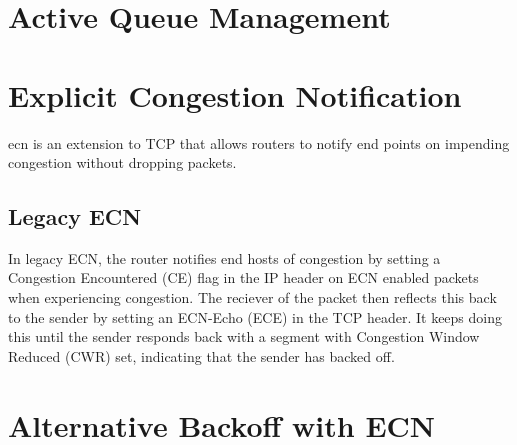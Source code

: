 \section{Active Queue Management}

\section{Explicit Congestion Notification}

\gls{ecn} is an extension to TCP that allows routers to notify end points on impending congestion without dropping packets.

\subsection{Legacy ECN}
In legacy ECN, the router notifies end hosts of congestion by setting a Congestion Encountered (CE) flag in the IP header on ECN enabled packets when experiencing congestion. The reciever of the packet then reflects this back to the sender by setting an ECN-Echo (ECE) in the TCP header. It keeps doing this until the sender responds back with a segment with Congestion Window Reduced (CWR) set, indicating that the sender has backed off.


\section{Alternative Backoff with ECN}

